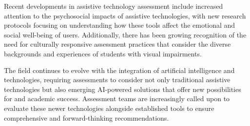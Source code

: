 Recent developments in assistive \gls{technology} assessment include increased attention to the psychosocial impacts of assistive technologies, with new research protocols focusing on understanding how these tools affect the emotional and social well-being of users. Additionally, there has been growing recognition of the need for culturally responsive assessment practices that consider the diverse backgrounds and experiences of students with visual impairments.

The field continues to evolve with the integration of artificial intelligence and  technologies, requiring assessments to consider not only traditional assistive technologies but also emerging AI-powered solutions that offer new possibilities for  and academic success. Assessment teams are increasingly called upon to evaluate these newer technologies alongside established tools to ensure comprehensive and forward-thinking  recommendations.

